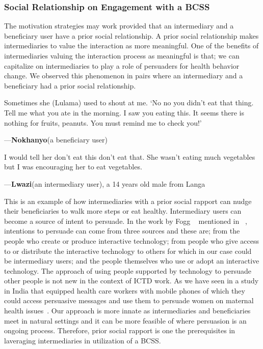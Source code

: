 \documentclass{sig-alternate}
\newenvironment{myquote}
               {\list{}{\rightmargin   \leftmargin
                        \parsep        0in }%
                \item\relax}
               {\endlist}
\newcommand{\userquote}[2]{\begin{samepage}\begin{myquote} 
     \em{\small{#2\begin{flushright}---#1\end{flushright}}}
   \end{myquote}\end{samepage}}
\begin{document}
\subsubsection*{\textbf{Social Relationship on Engagement with a BCSS}}

The motivation strategies may work provided that an intermediary and a
beneficiary user have a prior social relationship. A prior social relationship
makes intermediaries to value the interaction as more meaningful. One of the
benefits of intermediaries valuing the interaction process as meaningful is
that; we can capitalize on intermediaries to play a role of persuaders for
health behavior change. We observed this phenomenon in pairs where an
intermediary and a beneficiary had a prior social relationship.

\userquote{\textbf{Nokhanyo}(a beneficiary user)}
 {Sometimes she (Lulama) 
used to shout at me. `No no you didn't eat that thing. Tell me what you 
ate in the morning. I saw you eating this. It seems there is nothing for 
fruits, peanuts. You must remind me to check you!'}
\userquote{\textbf{Lwazi}(an intermediary user), a 14 years old male from 
Langa}
{I would tell her don't eat this don't eat that. She wasn't 
eating much vegetables but I was encouraging her to eat vegetables.}

This is an example of how intermediaries with a prior social rapport can nudge
their beneficiaries to walk more steps or eat healthy. Intermediary users can
become a source of intent to persuade. In the work by Fogg
~\cite{fogg1998persuasive} mentioned in ~\cite{Oinas-kukkonen:psd}, intentions
to persuade can come from three sources and these are; from the people who
create or produce interactive technology; from people who give access to or
distribute the interactive technology to others for which in our case could be
intermediary users; and the people themselves who use or adopt an interactive
technology. The approach of using people supported by technology to persuade
other people is not new in the context of ICTD work. As we have seen in a
study in India that equipped health care workers with mobile phones of which
they could access persuasive messages and use them to persuade women on
maternal health issues~\cite{ramachandran2010mobile,ramachandran2010research}.
Our approach is more innate as intermediaries and beneficiaries meet in
natural settings and it can be more feasible of where persuasion is an ongoing
process. Therefore, prior social rapport is one the prerequisites in laveraging intermediaries in utilization of a BCSS.
\end{document}
